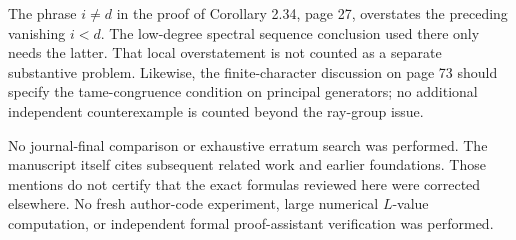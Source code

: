 \documentclass[10pt]{article}
\begin{document}
The phrase \(i\neq d\) in the proof of Corollary 2.34, page 27, overstates the preceding vanishing \(i<d\). The low-degree spectral sequence conclusion used there only needs the latter. That local overstatement is not counted as a separate substantive problem. Likewise, the finite-character discussion on page 73 should specify the tame-congruence condition on principal generators; no additional independent counterexample is counted beyond the ray-group issue.\par
No journal-final comparison or exhaustive erratum search was performed. The manuscript itself cites subsequent related work and earlier foundations. Those mentions do not certify that the exact formulas reviewed here were corrected elsewhere. No fresh author-code experiment, large numerical \(L\)-value computation, or independent formal proof-assistant verification was performed.\par
\end{document}

